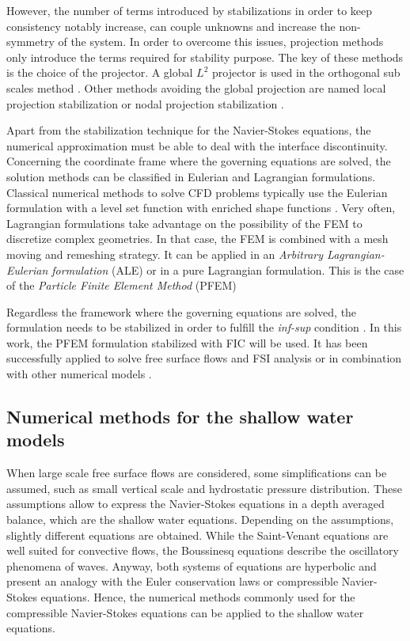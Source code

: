 However, the number of terms introduced by stabilizations in order to keep consistency notably increase, can couple unknowns and increase the non-symmetry of the system. In order to overcome this issues, projection methods only introduce the terms required for stability purpose. The key of these methods is the choice of the projector. A global $L^2$ projector is used in the orthogonal sub scales method \cite{codina2000}. Other methods avoiding the global projection are named local projection stabilization \cite{braack2006,matthies2007} or nodal projection stabilization \cite{badia2012}.


Apart from the stabilization technique for the Navier-Stokes equations, the numerical approximation must be able to deal with the interface discontinuity. Concerning the coordinate frame where the governing equations are solved, the solution methods can be classified in Eulerian and Lagrangian formulations. Classical numerical methods to solve CFD problems typically use the Eulerian formulation with a level set function \cite{chen1997} with enriched shape functions \cite{burman2015cut}. Very often, Lagrangian formulations take advantage on the possibility of the FEM to discretize complex geometries. In that case, the FEM is combined with a mesh moving and remeshing strategy. It can be applied in an \emph{Arbitrary Lagrangian-Eulerian formulation} (ALE) \cite{donea2004} or in a pure Lagrangian formulation. This is the case of the \emph{Particle Finite Element Method} (PFEM) \cite{onate2004,idelsohn2004}

Regardless the framework where the governing equations are solved, the formulation needs to be stabilized in order to fulfill the \emph{inf-sup} condition \cite{brezzi1991}. In this work, the PFEM formulation stabilized with FIC will be used. It has been successfully applied to solve free surface flows \cite{delpin2007} and FSI analysis \cite{onate2008} or in combination with other numerical models \cite{onate2022}.


\subsection{Numerical methods for the shallow water models}


When large scale free surface flows are considered, some simplifications can be assumed, such as small vertical scale and hydrostatic pressure distribution. These assumptions allow to express the Navier-Stokes equations in a depth averaged balance, which are the shallow water equations. Depending on the assumptions, slightly different equations are obtained. While the Saint-Venant equations are well suited for convective flows, the Boussinesq equations describe the oscillatory phenomena of waves. Anyway, both systems of equations are hyperbolic and present an analogy with the Euler conservation laws or compressible Navier-Stokes equations. Hence, the numerical methods commonly used for the compressible Navier-Stokes equations can be applied to the shallow water equations.

